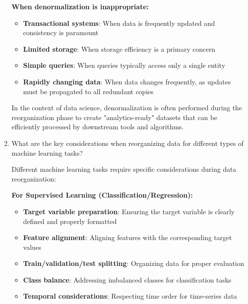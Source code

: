 \documentclass[12pt]{article}
\begin{document}
\begin{enumerate}
\begin{tcolorbox}[colback=blue!5!white,colframe=blue!75!black,title={Solution}]
    \textbf{When denormalization is inappropriate:}
    \begin{itemize}
        \item \textbf{Transactional systems}: When data is frequently updated and consistency is paramount
        \item \textbf{Limited storage}: When storage efficiency is a primary concern
        \item \textbf{Simple queries}: When queries typically access only a single entity
        \item \textbf{Rapidly changing data}: When data changes frequently, as updates must be propagated to all redundant copies
    \end{itemize}
    
    In the context of data science, denormalization is often performed during the reorganization phase to create "analytics-ready" datasets that can be efficiently processed by downstream tools and algorithms.
    \end{tcolorbox}
    
    \item What are the key considerations when reorganizing data for different types of machine learning tasks?
    
    \begin{tcolorbox}[colback=blue!5!white,colframe=blue!75!black,title={Solution}]
    Different machine learning tasks require specific considerations during data reorganization:
    
    \textbf{For Supervised Learning (Classification/Regression):}
    \begin{itemize}
        \item \textbf{Target variable preparation}: Ensuring the target variable is clearly defined and properly formatted
        \item \textbf{Feature alignment}: Aligning features with the corresponding target values
        \item \textbf{Train/validation/test splitting}: Organizing data for proper evaluation
        \item \textbf{Class balance}: Addressing imbalanced classes for classification tasks
        \item \textbf{Temporal considerations}: Respecting time order for time-series data
    \end{itemize}
    

\end{tcolorbox}
\end{enumerate}
\end{document}
